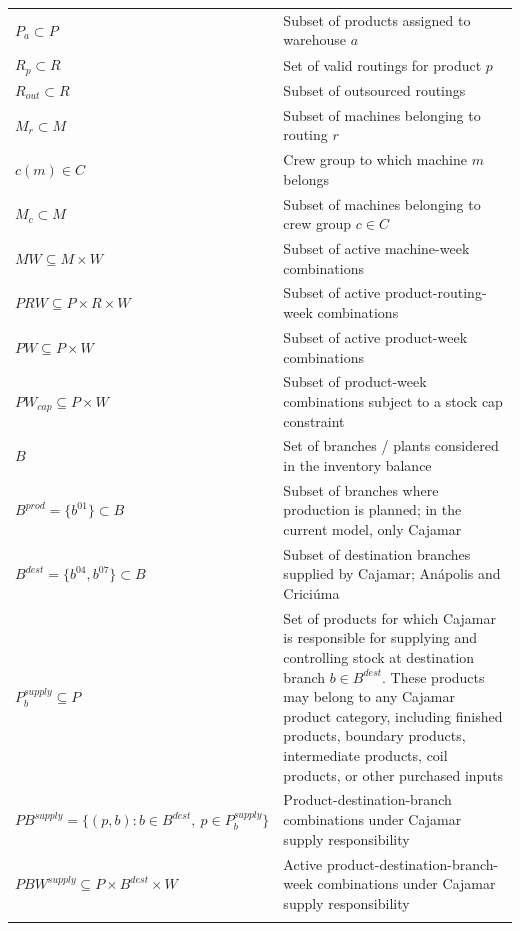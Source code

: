 \documentclass{article}
\begin{document}
\begin{longtable}{l p{8cm}}
$P_a \subset P$ & Subset of products assigned to warehouse $a$ \\
$R_p \subset R$ & Set of valid routings for product $p$ \\ 
$R_{out} \subset R$ & Subset of outsourced routings \\
$M_{r} \subset M$ & Subset of machines belonging to routing $r$ \\
$c(m) \in C$ & Crew group to which machine $m$ belongs \\
$M_c \subset M$ & Subset of machines belonging to crew group $c \in C$ \\
$MW \subseteq M \times W$ & Subset of active machine-week combinations \\ 
$PRW \subseteq P \times R \times W$ & Subset of active product-routing-week combinations \\ 
$PW \subseteq P \times W$ & Subset of active product-week combinations \\ 
$PW_{cap} \subseteq P \times W$ & Subset of product-week 
combinations subject to a stock cap constraint \\
\hline
$B$ & Set of branches / plants considered in the inventory balance \\
$B^{prod} = \{b^{01}\} \subset B$ & Subset of branches where production is planned; in the current model, only Cajamar \\
$B^{dest} = \{b^{04}, b^{07}\} \subset B$ & Subset of destination branches supplied by Cajamar; Anápolis and Criciúma \\
$P^{supply}_b \subseteq P$ & Set of products for which Cajamar is responsible for supplying and controlling stock at destination branch $b \in B^{dest}$. These products may belong to any Cajamar product category, including finished products, boundary products, intermediate products, coil products, or other purchased inputs \\
$PB^{supply} = \{(p,b): b \in B^{dest},\ p \in P^{supply}_b\}$ & Product-destination-branch combinations under Cajamar supply responsibility \\
$PBW^{supply} \subseteq P \times B^{dest} \times W$ & Active product-destination-branch-week combinations under Cajamar supply responsibility \\

\hline
\label{tab:sets} 
\end{longtable}
\end{document}
